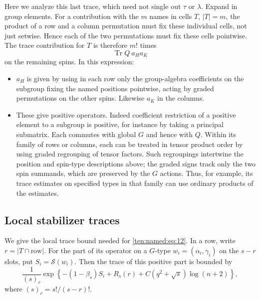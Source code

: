 Here we analyze this last trace, which need not single out \(\tau\) or \(\lambda\). Expand in group elements. For a contribution with the \(m\) names in cells \(T\), \(|T|=m\), the product of a row and a column permutation must fix these individual cells, not just setwise. Hence each of the two permutations must fix these cells pointwise. The trace contribution for \(T\) is therefore \(m!\) times
\begin{equation}
 \operatorname{Tr} Q\  a_H a_K
 \label{ten:named:eq:12}
\end{equation}
on the remaining spins. In this expression:
\begin{itemize}
\item \(a_H\) is given by using in each row only the group-algebra coefficients on the subgroup fixing the named positions pointwise, acting by graded permutations on the other spins. Likewise \(a_K\) in the columns.
\item These give positive operators. Indeed coefficient restriction of a positive element to a subgroup is positive, for instance by taking a principal submatrix. Each commutes with global \(G\) and hence with \(Q\). Within its family of rows or columns, each can be treated in tensor product order by using graded regrouping of tensor factors. Such regroupings intertwine the position and spin-type descriptions above; the graded signs track only the two spin summands, which are preserved by the \(G\) actions. Thus, for example, its trace estimates on specified types in that family can use ordinary products of the estimates.
\end{itemize}

\subsection{Local stabilizer traces}
We give the local trace bound needed for \eqref{ten:named:eq:12}. In a row, write \(r=|T\cap\text{row}|\). For the part of its operator on a \(G\)-type \(w_i=(\alpha_i,\gamma_i)\) on the \(s-r\) slots, put \(S_i=\mathcal S(w_i)\). Then the trace of this positive part is bounded by
\begin{equation}
 \frac{1}{(s)_r}
 \exp\left\{ -(1-\beta_s) S_i + R_s(r)
             + C (q^2+\sqrt{s})\log(n+2) \right\},
 \label{ten:named:eq:13}
\end{equation}
where \((s)_r=s!/(s-r)!\).

